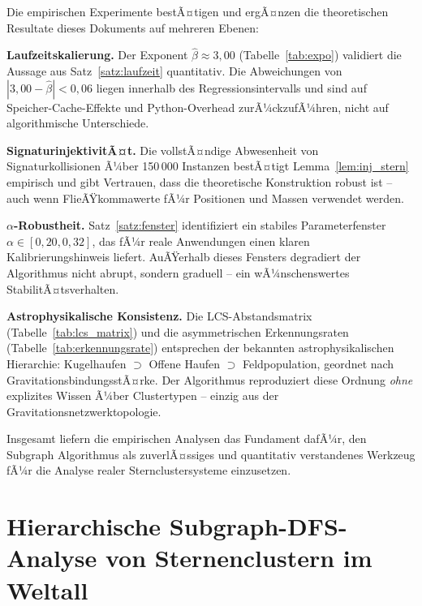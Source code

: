 ﻿\documentclass[a4paper,12pt]{report}
\theoremstyle{definition}
\begin{document}
Die empirischen Experimente bestÃ¤tigen und ergÃ¤nzen die theoretischen Resultate dieses Dokuments auf mehreren Ebenen:

\textbf{Laufzeitskalierung.} Der Exponent $\hat{\beta} \approx 3{,}00$ (Tabelle~\ref{tab:expo}) validiert die Aussage aus Satz~\ref{satz:laufzeit} quantitativ. Die Abweichungen von $|3{,}00 - \hat{\beta}| < 0{,}06$ liegen innerhalb des Regressionsintervalls und sind auf Speicher-Cache-Effekte und Python-Overhead zurÃ¼ckzufÃ¼hren, nicht auf algorithmische Unterschiede.

\textbf{SignaturinjektivitÃ¤t.} Die vollstÃ¤ndige Abwesenheit von Signaturkollisionen Ã¼ber 150\,000 Instanzen bestÃ¤tigt Lemma~\ref{lem:inj_stern} empirisch und gibt Vertrauen, dass die theoretische Konstruktion robust ist -- auch wenn FlieÃŸkommawerte fÃ¼r Positionen und Massen verwendet werden.

\textbf{$\alpha$-Robustheit.} Satz~\ref{satz:fenster} identifiziert ein stabiles Parameterfenster $\alpha \in [0{,}20, 0{,}32]$, das fÃ¼r reale Anwendungen einen klaren Kalibrierungshinweis liefert. AuÃŸerhalb dieses Fensters degradiert der Algorithmus nicht abrupt, sondern graduell -- ein wÃ¼nschenswertes StabilitÃ¤tsverhalten.

\textbf{Astrophysikalische Konsistenz.} Die LCS-Abstandsmatrix (Tabelle~\ref{tab:lcs_matrix}) und die asymmetrischen Erkennungsraten (Tabelle~\ref{tab:erkennungsrate}) entsprechen der bekannten astrophysikalischen Hierarchie: Kugelhaufen $\supset$ Offene Haufen $\supset$ Feldpopulation, geordnet nach GravitationsbindungsstÃ¤rke. Der Algorithmus reproduziert diese Ordnung \emph{ohne} explizites Wissen Ã¼ber Clustertypen -- einzig aus der Gravitationsnetzwerktopologie.

Insgesamt liefern die empirischen Analysen das Fundament dafÃ¼r, den Subgraph Algorithmus als zuverlÃ¤ssiges und quantitativ verstandenes Werkzeug fÃ¼r die Analyse realer Sternclustersysteme einzusetzen.

\chapter{Hierarchische Subgraph-DFS-Analyse von Sternenclustern im Weltall}
\label{sec:hsdfs_sterne}
\end{document}
